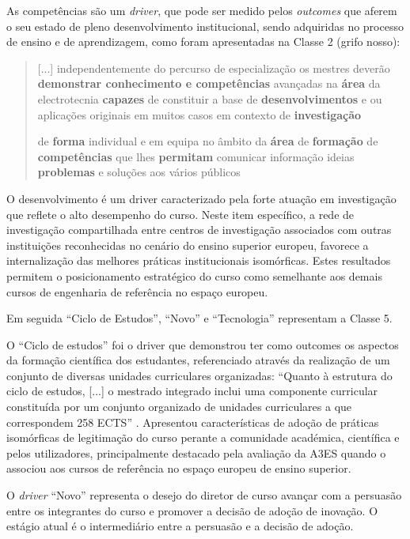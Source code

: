 \documentclass{textolivre}
\begin{document}
As competências são um \textit{driver}, que pode ser medido pelos \textit{outcomes} que aferem o seu estado de pleno desenvolvimento institucional, sendo adquiridas no processo de ensino e de aprendizagem, como foram apresentadas na Classe 2 (grifo nosso):

\begin{quote}
[...] independentemente do percurso de especialização os mestres deverão \textbf{demonstrar conhecimento e competências} avançadas na \textbf{área} da electrotecnia \textbf{capazes} de constituir a base de \textbf{desenvolvimentos} e ou aplicações originais em muitos casos em contexto de \textbf{investigação}

de \textbf{forma} individual e em equipa no âmbito da \textbf{área} de \textbf{formação} de \textbf{competências} que lhes \textbf{permitam} comunicar informação ideias \textbf{problemas} e soluções aos vários públicos
\end{quote}

O desenvolvimento é um driver caracterizado pela forte atuação em investigação que reflete o alto desempenho do curso. Neste item específico, a rede de investigação compartilhada entre centros de investigação associados com outras instituições reconhecidas no cenário do ensino superior europeu, favorece a internalização das melhores práticas institucionais isomórficas. Estes resultados permitem o posicionamento estratégico do curso como semelhante aos demais cursos de engenharia de referência no espaço europeu.

Em seguida “Ciclo de Estudos”, “Novo” e “Tecnologia” representam a Classe 5.

O “Ciclo de estudos” foi o driver que demonstrou ter como outcomes os aspectos da formação científica dos estudantes, referenciado através da realização de um conjunto de diversas unidades curriculares organizadas: “Quanto à estrutura do ciclo de estudos, [...] o mestrado integrado inclui uma componente curricular constituída por um conjunto organizado de unidades curriculares a que correspondem 258 ECTS” \cite[parág. 5]{utad2015}. Apresentou características de adoção de práticas isomórficas de legitimação do curso perante a comunidade académica, científica e pelos utilizadores, principalmente destacado pela avaliação da A3ES quando o associou aos cursos de referência no espaço europeu de ensino superior.

O \textit{driver} “Novo” representa o desejo do diretor de curso avançar com a persuasão entre os integrantes do curso e promover a decisão de adoção de inovação. O estágio atual é o intermediário entre a persuasão e a decisão de adoção.
\end{document}
